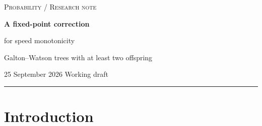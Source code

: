\documentclass[11pt,a4paper]{article}
\numberwithin{equation}{section}
\theoremstyle{notethm}
\theoremstyle{definition}
\begin{document}
\thispagestyle{firstpage}
\begin{flushleft}
{\small\scshape\color{muted}Probability \quad / \quad Research note}\par
\vspace{0.6em}
{\fontsize{22}{26}\selectfont\bfseries A fixed-point correction\par
for speed monotonicity}\par
\vspace{0.5em}
{\large Galton--Watson trees with at least two offspring}\par
\vspace{0.7em}
{\small\color{muted}25 September 2026 \quad\textperiodcentered\quad Working draft}
\end{flushleft}
\vspace{-.3em}
\noindent\rule{\textwidth}{0.4pt}
\vspace{.2em}

\begin{abstract}
We give an argument that the speed of a biased random walk on a
Galton--Watson tree is strictly decreasing in the bias towards the root,
throughout the positive-speed regime, when the offspring law has finite
mean and is supported on $\{2,3,\ldots\}$. The proof compares the recursive
laws of escape probabilities. An inverse-square reweighting inequality
retains the contribution of at least two children. Combined with a
symmetric speed formula, it yields an explicit correction that vanishes
on every recursive fixed point and gives the signs needed for comparison.
For $1<\lambda<m$, this proves a strictly negative upper right Dini
derivative without differentiating the infinite-depth escape probability;
a known low-parameter theorem covers the remaining interval. Under an
additional exponential-moment assumption, the classical derivative exists
and is strictly negative throughout the positive-speed regime.
\end{abstract}


\section{Introduction}\label{sec:statement}
\end{document}
